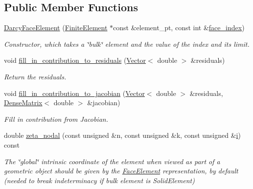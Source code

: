 \subsection*{Public Member Functions}
\begin{DoxyCompactItemize}
\item 
\hyperlink{classoomph_1_1DarcyFaceElement_a71513f63463e069ac1cc1ae267f6ba5b}{Darcy\+Face\+Element} (\hyperlink{classoomph_1_1FiniteElement}{Finite\+Element} $\ast$const \&element\+\_\+pt, const int \&\hyperlink{classoomph_1_1FaceElement_a478d577ac6db67ecc80f1f02ae3ab170}{face\+\_\+index})
\begin{DoxyCompactList}\small\item\em Constructor, which takes a \char`\"{}bulk\char`\"{} element and the value of the index and its limit. \end{DoxyCompactList}\item 
void \hyperlink{classoomph_1_1DarcyFaceElement_a11467dd44ab18f3551d52823612f289b}{fill\+\_\+in\+\_\+contribution\+\_\+to\+\_\+residuals} (\hyperlink{classoomph_1_1Vector}{Vector}$<$ double $>$ \&residuals)
\begin{DoxyCompactList}\small\item\em Return the residuals. \end{DoxyCompactList}\item 
void \hyperlink{classoomph_1_1DarcyFaceElement_a7b114cbc2c42545d84be0342801ae7c0}{fill\+\_\+in\+\_\+contribution\+\_\+to\+\_\+jacobian} (\hyperlink{classoomph_1_1Vector}{Vector}$<$ double $>$ \&residuals, \hyperlink{classoomph_1_1DenseMatrix}{Dense\+Matrix}$<$ double $>$ \&jacobian)
\begin{DoxyCompactList}\small\item\em Fill in contribution from Jacobian. \end{DoxyCompactList}\item 
double \hyperlink{classoomph_1_1DarcyFaceElement_aeee8ea8c6a62b345269c6339ffe8eed4}{zeta\+\_\+nodal} (const unsigned \&n, const unsigned \&k, const unsigned \&\hyperlink{cfortran_8h_adb50e893b86b3e55e751a42eab3cba82}{i}) const
\begin{DoxyCompactList}\small\item\em The \char`\"{}global\char`\"{} intrinsic coordinate of the element when viewed as part of a geometric object should be given by the \hyperlink{classoomph_1_1FaceElement}{Face\+Element} representation, by default (needed to break indeterminacy if bulk element is Solid\+Element) \end{DoxyCompactList}\item 

\end{DoxyCompactItemize}
